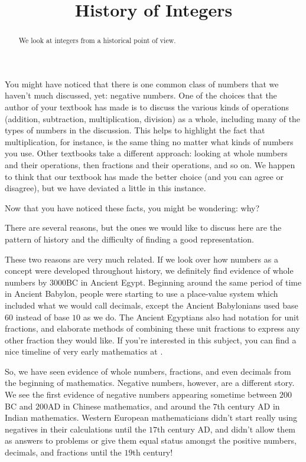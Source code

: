 \documentclass{ximera}
\title{History of Integers}
\begin{document}
\begin{abstract}
We look at integers from a historical point of view.
\end{abstract}

\maketitle

You might have noticed that there is one common class of numbers that we haven't much discussed, yet: negative numbers.  One of the choices that the author of your textbook has made is to discuss the various kinds of operations (addition, subtraction, multiplication, division) as a whole, including many of the types of numbers in the discussion.  This helps to highlight the fact that multiplication, for instance, is the same thing no matter what kinds of numbers you use.  Other textbooks take a different approach: looking at whole numbers and their operations, then fractions and their operations, and so on.  We happen to think that our textbook has made the better choice (and you can agree or disagree), but we have deviated a little in this instance. 

Now that you have noticed these facts, you might be wondering: why?

There are several reasons, but the ones we would like to discuss here are the pattern of history and the difficulty of finding a good representation.

These two reasons are very much related.  If we look over how numbers as a concept were developed throughout history, we definitely find evidence of whole numbers by $3000$BC in Ancient Egypt.  Beginning around the same period of time in Ancient Babylon, people were starting to use a place-value system which included what we would call decimals, except the Ancient Babylonians used base $60$ instead of base $10$ as we do.  The Ancient Egyptians also had notation for unit fractions, and elaborate methods of combining these unit fractions to express any other fraction they would like.  If you're interested in this subject, you can find a nice timeline of very early mathematics at .



So, we have seen evidence of whole numbers, fractions, and even decimals from the beginning of mathematics.  Negative numbers, however, are a different story.  We see the first evidence of negative numbers appearing sometime between $200$BC and $200$AD in Chinese mathematics, and around the $7$th century AD in Indian mathematics.  Western European mathematicians didn't start really using negatives in their calculations until the $17$th century AD, and didn't allow them as answers to problems or give them equal status amongst the positive numbers, decimals, and fractions until the $19$th century! 
\end{document}

